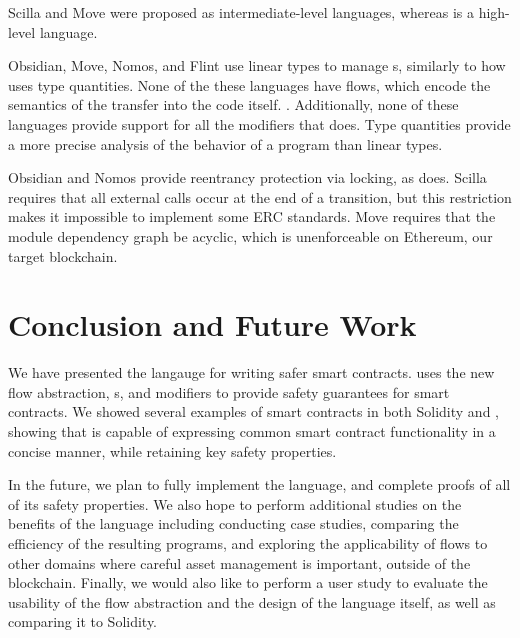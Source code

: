 \documentclass[dvipsnames, usenames, sigconf]{acmart}
\begin{document}
Scilla and Move were proposed as intermediate-level languages, whereas \langName is a high-level language.

Obsidian, Move, Nomos, and Flint use linear types to manage \assetTxt{}s, similarly to how \langName uses type quantities.
None of the these languages have flows, which encode the semantics of the transfer into the code itself.  .
Additionally, none of these languages provide support for all the modifiers that \langName does.
Type quantities provide a more precise analysis of the behavior of a program than linear types.

Obsidian and Nomos provide reentrancy protection via locking, as \langName does.
Scilla requires that all external calls occur at the end of a transition, but this restriction makes it impossible to implement some ERC standards.
Move requires that the module dependency graph be acyclic, which is unenforceable on Ethereum, our target blockchain.

\section{Conclusion and Future Work}

We have presented the \langName langauge for writing safer smart contracts.
\langName uses the new flow abstraction, \assetTxt{}s, and modifiers to provide safety guarantees for smart contracts.
We showed several examples of smart contracts in both Solidity and \langName, showing that \langName is capable of expressing common smart contract functionality in a concise manner, while retaining key safety properties.

In the future, we plan to fully implement the \langName language, and complete proofs of all of its safety properties.
We also hope to perform additional studies on the benefits of the language including conducting case studies, comparing the efficiency of the resulting programs, and exploring the applicability of flows to other domains where careful asset management is important, outside of the blockchain.
Finally, we would also like to perform a user study to evaluate the usability of the flow abstraction and the design of the language itself, as well as comparing it to Solidity.



\end{document}
